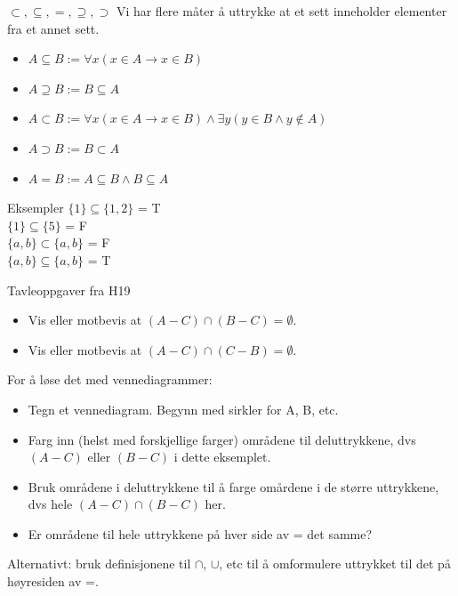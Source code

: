 \begin{frame}{$\subset, \subseteq, =, \supseteq, \supset$}
    Vi har flere måter å uttrykke at et sett inneholder elementer fra et annet sett.
    \begin{itemize}
        \item $A \subseteq B := \forall x (x \in A \rightarrow x \in B)$
        \item $A \supseteq B := B \subseteq A$
        \item $A \subset B := \forall x (x \in A \rightarrow x \in B) \land \exists y (y \in B \land y \notin A)$
        \item $A \supset B := B \subset A$
        \item $A = B := A \subseteq B \land B \subseteq A$
    \end{itemize}
    \pause
    \begin{block}{Eksempler}
        $\{1\} \subseteq \{1, 2\}$ = T\\
        $\{1\} \subseteq \{5\}$ = F\\
        $\{a, b\} \subset \{a, b\}$ = F\\
        $\{a, b\} \subseteq \{a, b\}$ = T
    \end{block}
    
\end{frame}

\begin{frame}{Tavleoppgaver fra H19}
    \begin{itemize}
        \item Vis eller motbevis at $(A - C) \cap (B - C) = \emptyset.$
        \item Vis eller motbevis at $(A - C) \cap (C - B) = \emptyset.$
    \end{itemize}
    
    For å løse det med vennediagrammer:
    \begin{itemize}
        \item Tegn et vennediagram. Begynn med sirkler for A, B, etc.
        \item Farg inn (helst med forskjellige farger) områdene til deluttrykkene, dvs $(A - C)$ eller $(B - C)$ i dette eksemplet.
        \item Bruk områdene i deluttrykkene til å farge omårdene i de større uttrykkene, dvs hele $(A - C) \cap (B - C)$ her.
        \item Er områdene til hele uttrykkene på hver side av = det samme?
    \end{itemize}
    \pause
    Alternativt: bruk definisjonene til $\cap$, $\cup$, etc til å omformulere uttrykket til det på høyresiden av =.
\end{frame}

